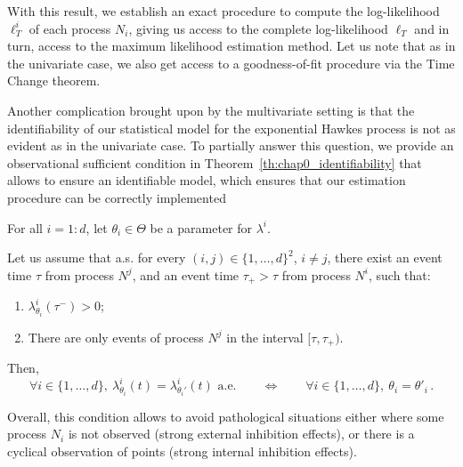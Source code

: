       With this result, we establish an exact procedure to compute the log-likelihood $\ell_T^i$ of each process $N_i$, giving us access to the complete log-likelihood $\ell_T$ and in turn, access to the maximum likelihood estimation method.
      Let us note that as in the univariate case, we also get access to a goodness-of-fit procedure via the Time Change theorem.
      
      Another complication brought upon by the multivariate setting is that the identifiability of our statistical model for the exponential Hawkes process is not as evident as in the univariate case.
      To partially answer this question, we provide an observational sufficient condition in Theorem~\ref{th:chap0_identifiability} that allows to ensure an identifiable model, which ensures that our estimation procedure can be correctly implemented

      \begin{theorem}[Identifiability]\label{th:chap0_identifiability}
        For all $i=1\colon d$, let $\theta_i \in \Theta$ be a parameter for $\lambda^i$.

        Let us assume that a.s. for every $(i, j) \in \{1, \dots, d\}^2$, $i\neq j$,
        there exist an event time \(\tau\) from process \(N^j\),
        and an event time \(\tau_+ > \tau\) from process \(N^i\), such that:
        \begin{enumerate}
            \item $\lambda_{\theta_i}^i(\tau^-) > 0$;
            \item There are only events of process $N^j$ in the interval $[\tau, \tau_+)$.
        \end{enumerate} 
        
        Then,
        \[
          \forall i \in \{1, \dots, d\},~
          \lambda_{\theta_i}^i(t) = \lambda_{\theta_i'}^i(t) \text{ a.e.}
          \qquad
          \iff
          \qquad
          \forall i \in \{1, \dots, d\},~\theta_i = \theta'_i\,.
        \]
    \end{theorem}

      Overall, this condition allows to avoid pathological situations either where some process $N_i$ is not observed (strong external inhibition effects), or there is a cyclical observation of points (strong internal inhibition effects).

